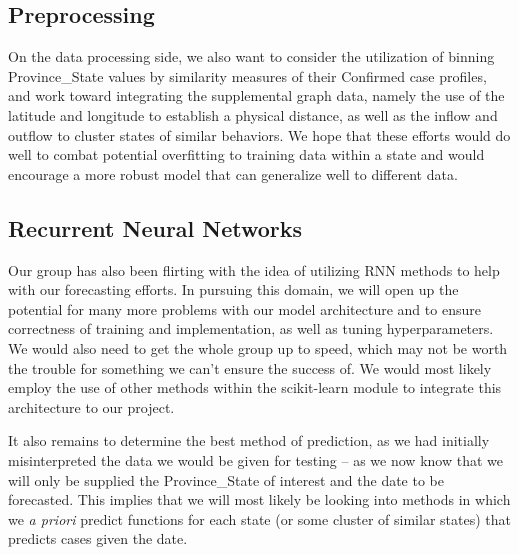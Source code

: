 \documentclass[sigconf,nonacm]{acmart}
\begin{document}
\subsection{Preprocessing}

On the data processing side, we also want to consider the utilization of
binning Province\_State values by similarity measures of their Confirmed case
profiles, and work toward integrating the supplemental graph data, namely the
use of the latitude and longitude to establish a physical distance, as well as
the inflow and outflow to cluster states of similar behaviors. We hope that
these efforts would do well to combat potential overfitting to training data
within a state and would encourage a more robust model that can generalize well
to different data.

\subsection{Recurrent Neural Networks}

Our group has also been flirting with the idea of utilizing RNN methods to help
with our forecasting efforts. In pursuing this domain, we will open up the
potential for many more problems with our model architecture and to ensure
correctness of training and implementation, as well as tuning hyperparameters.
We would also need to get the whole group up to speed, which may not be worth
the trouble for something we can’t ensure the success of. We would most likely
employ the use of other methods within the scikit-learn module to integrate
this architecture to our project.
 
It also remains to determine the best method of prediction, as we had initially
misinterpreted the data we would be given for testing – as we now know that we
will only be supplied the Province\_State of interest and the date to be
forecasted. This implies that we will most likely be looking into methods in
which we \emph{a priori} predict functions for each state (or some cluster of
similar states) that predicts cases given the date.




\end{document}
